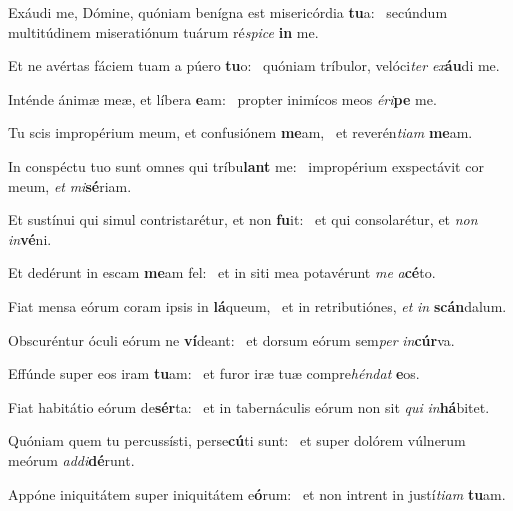 
\item Exáudi me, Dómine, quóniam benígna est misericórdia \textbf{tu}a:~\psstar{} secúndum multitúdinem miseratiónum tuárum ré\textit{spice} \textbf{in} me.

\item Et ne avértas fáciem tuam a púero \textbf{tu}o:~\psstar{} quóniam tríbulor, velóci\textit{ter} \textit{ex}\textbf{áu}di me.

\item Inténde ánimæ meæ, et líbera \textbf{e}am:~\psstar{} propter inimícos meos \textit{éri}\textbf{pe} me.

\item Tu scis impropérium meum, et confusiónem \textbf{me}am,~\psstar{} et reverén\textit{tiam} \textbf{me}am.

\item In conspéctu tuo sunt omnes qui tríbu\textbf{lant} me:~\psstar{} impropérium exspectávit cor meum, \textit{et} \textit{mi}\textbf{sé}riam.

\item Et sustínui qui simul contristarétur, et non \textbf{fu}it:~\psstar{} et qui consolarétur, et \textit{non} \textit{in}\textbf{vé}ni.

\item Et dedérunt in escam \textbf{me}am fel:~\psstar{} et in siti mea potavérunt \textit{me} \textit{a}\textbf{cé}to.

\item Fiat mensa eórum coram ipsis in \textbf{lá}queum,~\psstar{} et in retributiónes, \textit{et} \textit{in} \textbf{scán}dalum.

\item Obscuréntur óculi eórum ne \textbf{ví}deant:~\psstar{} et dorsum eórum sem\textit{per} \textit{in}\textbf{cúr}va.

\item Effúnde super eos iram \textbf{tu}am:~\psstar{} et furor iræ tuæ compre\textit{héndat} \textbf{e}os.

\item Fiat habitátio eórum de\textbf{sér}ta:~\psstar{} et in tabernáculis eórum non sit \textit{qui} \textit{in}\textbf{há}bitet.

\item Quóniam quem tu percussísti, perse\textbf{cú}ti sunt:~\psstar{} et super dolórem vúlnerum meórum \textit{addi}\textbf{dé}runt.

\item Appóne iniquitátem super iniquitátem e\textbf{ó}rum:~\psstar{} et non intrent in justí\textit{tiam} \textbf{tu}am.


